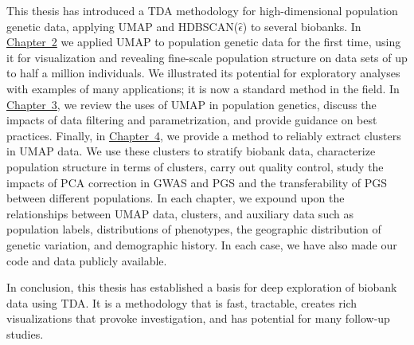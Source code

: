 This thesis has introduced a TDA methodology for high-dimensional population genetic data, applying UMAP and HDBSCAN($\hat{\epsilon}$) to several biobanks. In \hyperref[chap:chapter2]{Chapter~2} we applied UMAP to population genetic data for the first time, using it for visualization and revealing fine-scale population structure on data sets of up to half a million individuals. We illustrated its potential for exploratory analyses with examples of many applications; it is now a standard method in the field. In \hyperref[chap:chapter3]{Chapter~3}, we review the uses of UMAP in population genetics, discuss the impacts of data filtering and parametrization, and provide guidance on best practices. Finally, in \hyperref[chap:chapter4]{Chapter~4}, we provide a method to reliably extract clusters in UMAP data. We use these clusters to stratify biobank data, characterize population structure in terms of clusters, carry out quality control, study the impacts of PCA correction in GWAS and PGS and the transferability of PGS between different populations. In each chapter, we expound upon the relationships between UMAP data, clusters, and auxiliary data such as population labels, distributions of phenotypes, the geographic distribution of genetic variation, and demographic history. In each case, we have also made our code and data publicly available. 

In conclusion, this thesis has established a basis for deep exploration of biobank data using TDA. It is a methodology that is fast, tractable, creates rich visualizations that provoke investigation, and has potential for many follow-up studies.

\clearpage

